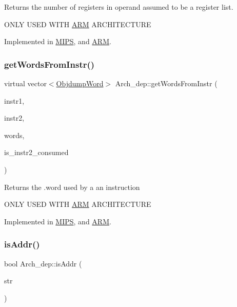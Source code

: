 Returns the number of registers in operand assumed to be a register list.

O\+N\+LY U\+S\+ED W\+I\+TH \hyperlink{classARM}{A\+RM} A\+R\+C\+H\+I\+T\+E\+C\+T\+U\+RE 

Implemented in \hyperlink{classMIPS_a475db73349cc940f47e5e0c310ac8912}{M\+I\+PS}, and \hyperlink{classARM_a356b1ab7252a6f1183747378a2d66b08}{A\+RM}.

\mbox{\label{classArch__dep_a00e2fabd6cc0f5b9c36593a67f793d7a}} 
\subsubsection{\texorpdfstring{get\+Words\+From\+Instr()}{getWordsFromInstr()}}
{\footnotesize\ttfamily virtual vector$<$\hyperlink{classObjdumpWord}{Objdump\+Word}$>$ Arch\+\_\+dep\+::get\+Words\+From\+Instr (\begin{DoxyParamCaption}\item[{const \hyperlink{classObjdumpInstruction}{Objdump\+Instruction} \&}]{instr1,  }\item[{const \hyperlink{classObjdumpInstruction}{Objdump\+Instruction} \&}]{instr2,  }\item[{vector$<$ \hyperlink{classObjdumpWord}{Objdump\+Word} $>$}]{words,  }\item[{bool \&}]{is\+\_\+instr2\+\_\+consumed }\end{DoxyParamCaption})\hspace{0.3cm}{\ttfamily [pure virtual]}}

Returns the .word used by a an instruction

O\+N\+LY U\+S\+ED W\+I\+TH \hyperlink{classARM}{A\+RM} A\+R\+C\+H\+I\+T\+E\+C\+T\+U\+RE 

Implemented in \hyperlink{classMIPS_a1e122412b5edefe1b92b2b4851255a69}{M\+I\+PS}, and \hyperlink{classARM_a550a39c74ccd7308c20d1a3259f25ca2}{A\+RM}.

\mbox{\label{classArch__dep_a4408d5e5fedffe7a6877f226db4ebc69}} 
\subsubsection{\texorpdfstring{is\+Addr()}{isAddr()}}
{\footnotesize\ttfamily bool Arch\+\_\+dep\+::is\+Addr (\begin{DoxyParamCaption}\item[{const string \&}]{str }\end{DoxyParamCaption})}

